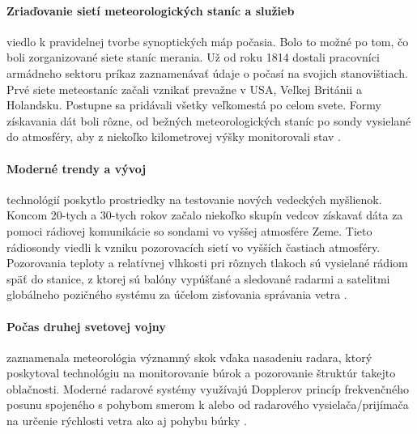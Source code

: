 \paragraph{Zriaďovanie sietí meteorologických staníc a služieb} viedlo k pravidelnej tvorbe synoptických máp počasia. Bolo to možné po tom, čo boli zorganizované siete staníc merania. Už od roku 1814 dostali pracovníci armádneho sektoru príkaz zaznamenávať údaje o počasí na svojich stanovištiach. Prvé siete meteostaníc začali vznikať prevažne v USA, Veľkej Británii a Holandsku. Postupne sa pridávali všetky veľkomestá po celom svete. Formy získavania dát boli rôzne, od bežných meteorologických staníc po sondy vysielané do atmosféry, aby z niekoľko kilometrovej výšky monitorovali stav \cite{meteo}. 

\paragraph{Moderné trendy a vývoj} technológií poskytlo prostriedky na testovanie nových vedeckých myšlienok. Koncom 20-tych a 30-tych rokov začalo niekoľko skupín vedcov získavať dáta za pomoci rádiovej komunikácie so sondami vo vyššej atmosfére Zeme. Tieto rádiosondy viedli k vzniku pozorovacích sietí vo vyšších častiach atmosféry. Pozorovania teploty a relatívnej vlhkosti pri rôznych tlakoch sú vysielané rádiom späť do stanice, z ktorej sú balóny vypúšťané a sledované radarmi a satelitmi globálneho pozičného systému za účelom zisťovania správania vetra \cite{meteo}.

\paragraph{Počas druhej svetovej vojny} zaznamenala meteorológia významný skok vďaka nasadeniu radara, ktorý poskytoval technológiu na monitorovanie búrok a pozorovanie štruktúr takejto oblačnosti. Moderné radarové systémy využívajú Dopplerov princíp frekvenčného posunu spojeného s pohybom smerom k alebo od radarového vysielača/prijímača na určenie rýchlosti vetra ako aj pohybu búrky \cite{meteo}.

